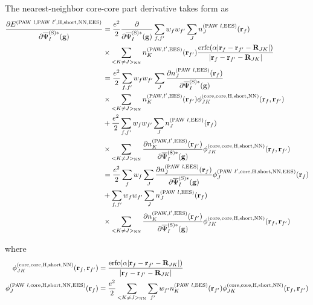 \documentclass[paper=a4, fontsize=11pt]{article} %
\numberwithin{equation}{section} %
\numberwithin{figure}{section} %
\numberwithin{table}{section} %
\newcommand{\p}{\partial}
\newcommand{\bg}{{\bf{g}}}
\newcommand{\br}{{\bf{r}}}
\newcommand{\bR}{{\bf{R}}}
\newcommand{\rS}{{\mathrm{S}}}
\newcommand{\rEES}{{\mathrm{EES}}}
\newcommand{\rcore}{{\mathrm{core}}}
\newcommand{\rNN}{{\mathrm{NN}}}
\newcommand{\rshort}{{\mathrm{short}}}
\newcommand{\rerfc}{{\mathrm{erfc}}}
\newcommand{\rP}{{\mathrm{PAW}}}
\newcommand{\rH}{{\mathrm{H}}}
\newcommand{\psigsc}{{\overline \Psi_I^{(\rS)*}(\bg)}}
\begin{document}
The nearest-neighbor core-core part derivative takes form as
\begin{equation}\label{dEdpHshortNN1}
\begin{split}
\frac{\p E^{(\rP\ l,\rP\ l',\rH,\rshort,\rNN,\rEES)}}{\p \psigsc}
&= \frac{e^2}{2}\frac{\p }{\p \psigsc}\sum_{f,f'} w_f w_{f'} \sum_J n_J^{(\rP\ l,\rEES)}(\br_f)\\
&\times \sum_{<K \neq J>_\rNN}n_K^{(\rP,l',\rEES)}(\br_{f'}) \frac{\rerfc(\alpha|\br_f-\br_{f'}-\bR_{JK}|)}{|\br_f-\br_{f'}-\bR_{JK}|}\\
&= \frac{e^2}{2}\sum_{f,f'} w_f w_{f'} \sum_J \frac{\p n_J^{(\rP\ l,\rEES)}(\br_f)}{\p \psigsc}\\
&\times \sum_{<K \neq J>_\rNN}n_K^{(\rP,l',\rEES)}(\br_{f'}) \phi_{JK}^{(\rcore,\rcore,\rH,\rshort,\rNN)}(\br_f,\br_{f'}) \\
&+ \frac{e^2}{2}\sum_{f,f'} w_f w_{f'} \sum_J n_J^{(\rP\ l,\rEES)}(\br_f)\\
&\times \sum_{<K \neq J>_\rNN}\frac{\p n_K^{(\rP,l',\rEES)}(\br_{f'})}{\p \psigsc} \phi_{JK}^{(\rcore,\rcore,\rH,\rshort,\rNN)}(\br_f,\br_{f'}) \\ 
&= \frac{e^2}{2}\sum_{f} w_f \sum_J \frac{\p n_J^{(\rP\ l,\rEES)}(\br_f)}{\p \psigsc}\phi_J^{(\rP\ l',\rcore,\rH,\rshort,\rNN,\rEES)}(\br_f)\\
&+ \sum_{f,f'} w_f w_{f'} \sum_J n_J^{(\rP\ l,\rEES)}(\br_f)\\
&\times \sum_{<K \neq J>_\rNN}\frac{\p n_K^{(\rP,l',\rEES)}(\br_{f'})}{\p \psigsc} \phi_{JK}^{(\rcore,\rcore,\rH,\rshort,\rNN)}(\br_f,\br_{f'}) \\ 
\end{split}
\end{equation}

where
\begin{equation}
\begin{split}
\phi_{JK}^{(\rcore,\rcore,\rH,\rshort,\rNN)}(\br_f,\br_{f'}) &= \frac{\rerfc(\alpha|\br_f-\br_{f'}-\bR_{JK}|)}{|\br_f-\br_{f'}-\bR_{JK}|} \\
\phi_J^{(\rP\ l,\rcore,\rH,\rshort,\rNN,\rEES)}(\br_f) &= \frac{e^2}{2}\sum_{<K \neq J>_\rNN}\sum_{f'}w_{f'}n_K^{(\rP\ l,\rEES)}(\br_{f'}) \phi_{JK}^{(\rcore,\rcore,\rH,\rshort,\rNN)}(\br_f,\br_{f'}) \\
\end{split}
\end{equation}
\end{document}
